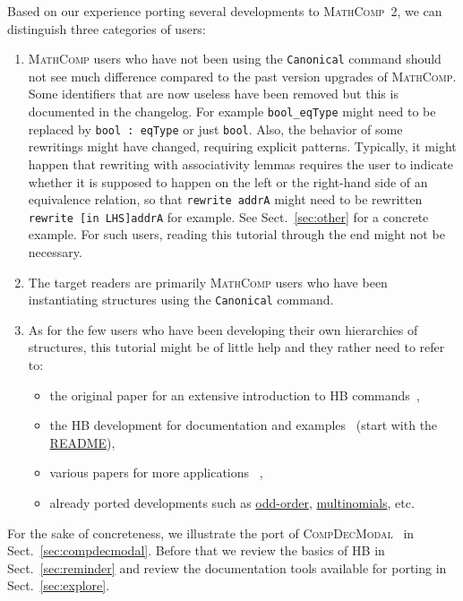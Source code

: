 \documentclass{article}
\def\mathcomp{\textsc{MathComp}}
\def\mathcomptwo{\mathcomp~2}
\def\hb{\textsc{HB}}
\def\compdecmodal{\textsc{CompDecModal}}
\def\coqin#1{\texttt{#1}}
\begin{document}
Based on our experience porting several developments to \mathcomptwo,
we can distinguish three categories of users:
\begin{enumerate}
\item \mathcomp{} users who have not been using the \coqin{Canonical}
  command should not see much difference compared to the past version
  upgrades of \mathcomp{}.
  Some identifiers that are now useless have been removed but this is
  documented in the changelog. For example \coqin{bool_eqType} might
  need to be replaced by \coqin{bool : eqType} or just \coqin{bool}.
  Also, the behavior of some rewritings might have changed, requiring
  explicit patterns. Typically, it might happen that rewriting with
  associativity lemmas requires the user to indicate whether it is
  supposed to happen on the left or the right-hand side of an
  equivalence relation, so that \coqin{rewrite addrA} might need to be
  rewritten \coqin{rewrite [in LHS]addrA} for example. See
  Sect.~\ref{sec:other} for a concrete example.
  For such users, reading this tutorial through the end might not be
  necessary.
\item The target readers are primarily \mathcomp{} users who have been
  instantiating structures using the \coqin{Canonical} command.
\item As for the few users who have been developing their own
  hierarchies of structures, this tutorial might be of little help and
  they rather need to refer to:
  \begin{itemize}
  \item the original paper for an extensive introduction to \hb{} commands~\cite{cohen2020fscd},
  \item the \hb{} development for documentation and examples~\cite{hb}
    (start with the \href{https://github.com/math-comp/hierarchy-builder#readme}{README}),
  \item various papers for more applications~\cite{mathcomp2021coq}
    \cite[Sect.~3]{affeldt2022arxiv} \cite[Sect.~4]{affeldt2023cpp},
  \item already ported developments such as
    \href{https://github.com/math-comp/odd-order}{odd-order},
    \href{https://github.com/math-comp/multinomials}{multinomials}, etc.
  \end{itemize}
\end{enumerate}

For the sake of concreteness, we illustrate the port of
\compdecmodal~\cite{compdecmodal} in Sect.~\ref{sec:compdecmodal}.
Before that we review the basics of \hb{} in Sect.~\ref{sec:reminder}
and review the documentation tools available for porting in
Sect.~\ref{sec:explore}.
\end{document}
